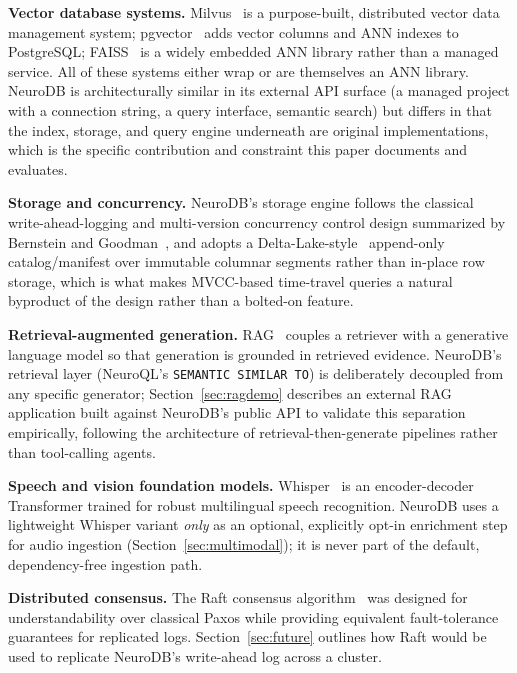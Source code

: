 \documentclass[conference]{IEEEtran}
\begin{document}
\textbf{Vector database systems.} Milvus~\cite{wang2021milvus} is a purpose-built,
distributed vector data management system; pgvector~\cite{pgvector} adds vector columns and
ANN indexes to PostgreSQL; FAISS~\cite{johnson2019faiss} is a widely embedded ANN library
rather than a managed service. All of these systems either wrap or are themselves an ANN
library. NeuroDB is architecturally similar in its external API surface (a managed project
with a connection string, a query interface, semantic search) but differs in that the index,
storage, and query engine underneath are original implementations, which is the specific
contribution and constraint this paper documents and evaluates.

\textbf{Storage and concurrency.} NeuroDB's storage engine follows the classical
write-ahead-logging and multi-version concurrency control design summarized by Bernstein and
Goodman~\cite{bernstein1981concurrency}, and adopts a Delta-Lake-style~\cite{armbrust2020deltalake}
append-only catalog/manifest over immutable columnar segments rather than in-place row
storage, which is what makes MVCC-based time-travel queries a natural byproduct of the
design rather than a bolted-on feature.

\textbf{Retrieval-augmented generation.} RAG~\cite{lewis2020rag} couples a retriever with a
generative language model so that generation is grounded in retrieved evidence. NeuroDB's
retrieval layer (NeuroQL's \texttt{SEMANTIC SIMILAR TO}) is deliberately decoupled from any
specific generator; Section~\ref{sec:ragdemo} describes an external RAG application built
against NeuroDB's public API to validate this separation empirically, following the
architecture of retrieval-then-generate pipelines rather than tool-calling agents.

\textbf{Speech and vision foundation models.} Whisper~\cite{radford2023whisper} is an
encoder-decoder Transformer trained for robust multilingual speech recognition. NeuroDB uses
a lightweight Whisper variant \emph{only} as an optional, explicitly opt-in enrichment step
for audio ingestion (Section~\ref{sec:multimodal}); it is never part of the default,
dependency-free ingestion path.

\textbf{Distributed consensus.} The Raft consensus algorithm~\cite{ongaro2014raft} was
designed for understandability over classical Paxos while providing equivalent
fault-tolerance guarantees for replicated logs. Section~\ref{sec:future} outlines how Raft
would be used to replicate NeuroDB's write-ahead log across a cluster.
\end{document}
